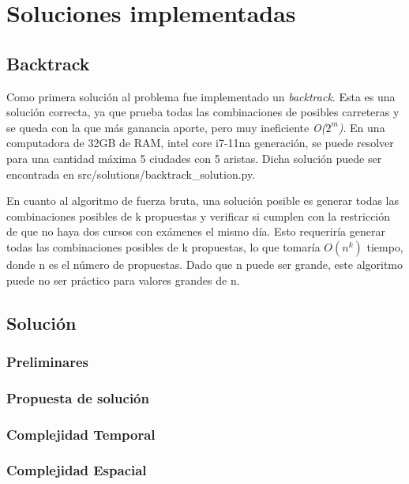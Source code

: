 \documentclass[10pt]{article} %
\begin{document}
	
	\section{Soluciones implementadas}
	
	\subsection{Backtrack}
		Como primera solución al problema fue implementado un \textit{backtrack}. Esta es una solución correcta, ya que prueba todas las combinaciones de posibles carreteras y se queda con la que más ganancia aporte, pero muy ineficiente \textit{O($2^{m}$)}. En una computadora de 32GB de RAM, intel core i7-11na generación, se puede resolver para una cantidad máxima 5 ciudades con 5 aristas. Dicha solución puede ser encontrada en src/solutions/backtrack\_solution.py.
		
		En cuanto al algoritmo de fuerza bruta, una solución posible es generar todas las combinaciones posibles de k propuestas y verificar si cumplen con la restricción de que no haya dos cursos con exámenes el mismo día. Esto requeriría generar todas las combinaciones posibles de k propuestas, lo que tomaría $O(n^k)$ tiempo, donde n es el número de propuestas. Dado que n puede ser grande, este algoritmo puede no ser práctico para valores grandes de n.
	
	\subsection{Soluci\'on}
	
	\subsubsection{Preliminares}
	
	\subsubsection{Propuesta de soluci\'on}
	
	\subsubsection{Complejidad Temporal}

	\subsubsection{Complejidad Espacial}
		
\end{document}
